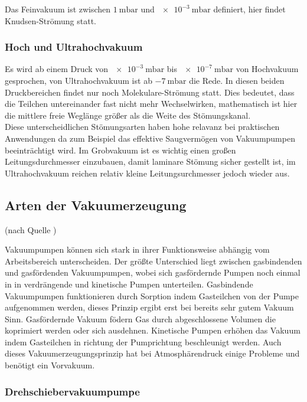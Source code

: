 			Das Feinvakuum ist zwischen $\SI{1}{\milli\bar}$ und $\SI{e-3}{\milli\bar}$ definiert, hier findet Knudsen-Strömung statt.

		\subsubsection{Hoch und Ultrahochvakuum} 
			Es wird ab einem Druck von $\SI{e-3}{\milli\bar}$ bis $\SI{e-7}{\milli\bar}$ von Hochvakuum gesprochen, von Ultrahochvakuum ist ab $\SI{-7}{\milli\bar}$ die Rede.		
			In diesen beiden Druckbereichen findet nur noch Molekulare-Strömung statt.
			Dies bedeutet, dass die Teilchen untereinander fast nicht mehr Wechselwirken, mathematisch ist hier die mittlere freie Weglänge größer als die Weite des Stömungskanal.
		\\
		Diese unterscheidlichen Stömungsarten haben hohe relavanz bei praktischen Anwendungen da zum Beispiel das effektive Saugvermögen von Vakuumpumpen beeinträchtigt wird.
		Im Grobvakuum ist es wichtig einen großen Leitungsdurchmesser einzubauen, damit laminare Stömung sicher gestellt ist,
		im Ultrahochvakuum reichen relativ kleine Leitungsurchmesser jedoch wieder aus.

	\subsection{Arten der Vakuumerzeugung}(nach Quelle \cite{peiffer})
		
		Vakuumpumpen können sich stark in ihrer Funktionsweise abhängig vom Arbeitsbereich unterscheiden.		
		Der größte Unterschied liegt zwischen gasbindenden und gasfördenden Vakuumpumpen, wobei sich gasfördernde Pumpen noch einmal in in verdrängende und kinetische Pumpen unterteilen.
		Gasbindende Vakuumpumpen funktionieren durch Sorption indem Gasteilchen von der Pumpe aufgenommen werden, dieses Prinzip ergibt erst bei bereits sehr gutem Vakuum Sinn.  Gasfördernde Vakuum födern Gas durch abgeschlossene Volumen die koprimiert werden oder sich ausdehnen.
		Kinetische Pumpen erhöhen das Vakuum indem Gasteilchen in richtung der Pumprichtung beschleunigt werden.
		Auch dieses Vakuumerzeugungsprinzip hat bei Atmosphärendruck einige Probleme und benötigt ein Vorvakuum.

		\subsubsection{Drehschiebervakuumpumpe} 
						
